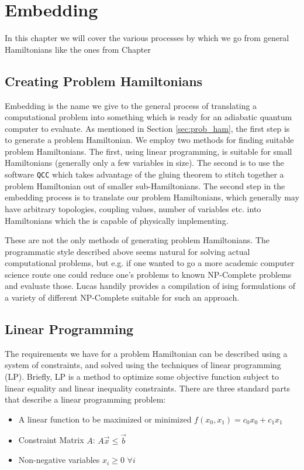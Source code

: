 \chapter{Embedding}
\label{chap:embed}
In this chapter we will cover the various processes by which we go from general Hamiltonians like the ones from Chapter 

\section{Creating Problem Hamiltonians}
Embedding is the name we give to the general process of translating a computational problem into something which is ready for an adiabatic quantum computer to evaluate.  As mentioned in Section \ref{sec:prob_ham}, the first step is to generate a problem Hamiltonian.  We employ two methods for finding suitable problem Hamiltonians.  The first, using linear programming, is suitable for small Hamiltonians (generally only a few variables in size).  The second is to use the software \texttt{QCC} which takes advantage of the gluing theorem to stitch together a problem Hamiltonian out of smaller sub-Hamiltonians.
The second step in the embedding process is to translate our problem Hamiltonians, which generally may have arbitrary topologies, coupling values, number of variables etc. into Hamiltonians which the \machine is capable of physically implementing.

These are not the only methods of generating problem Hamiltonians.  The programmatic style described above seems natural for solving actual computational problems, but e.g. if one wanted to go a more academic computer science route one could reduce one's problems to known NP-Complete problems and evaluate those.  Lucas \cite{lucas} handily provides a compilation of ising formulations of a variety of different NP-Complete suitable for such an approach.

\section{Linear Programming}
\label{sec:lin_prog}
The requirements we have for a problem Hamiltonian can be described using a system of constraints, and solved using the techniques of linear programming (LP).
Briefly, LP is a method to optimize some objective function subject to linear equality and linear inequality constraints.  There are three standard parts that describe a linear programming problem:

\begin{itemize}
	\item A linear function to be maximized or minimized
		\subitem $f(x_0,x_1) = c_0x_0 + c_1x_1$
	\item Constraint Matrix $A$:
		\subitem $A\vec{x} \le \vec{b} $
	\item Non-negative variables
		\subitem $x_i \ge 0$ $\forall i$
\end{itemize}


